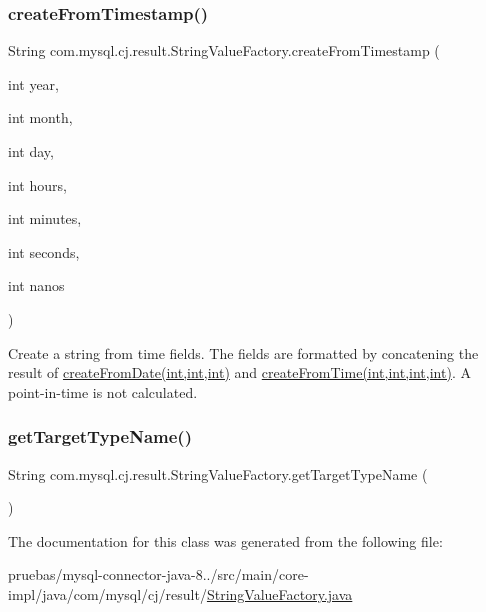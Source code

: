 \subsubsection{\texorpdfstring{create\+From\+Timestamp()}{createFromTimestamp()}}
{\footnotesize\ttfamily String com.\+mysql.\+cj.\+result.\+String\+Value\+Factory.\+create\+From\+Timestamp (\begin{DoxyParamCaption}\item[{int}]{year,  }\item[{int}]{month,  }\item[{int}]{day,  }\item[{int}]{hours,  }\item[{int}]{minutes,  }\item[{int}]{seconds,  }\item[{int}]{nanos }\end{DoxyParamCaption})}

Create a string from time fields. The fields are formatted by concatening the result of \mbox{\hyperlink{classcom_1_1mysql_1_1cj_1_1result_1_1_string_value_factory_a845e3704aa7f1a243b1fca5975dff12a}{create\+From\+Date(int,int,int)}} and \mbox{\hyperlink{classcom_1_1mysql_1_1cj_1_1result_1_1_string_value_factory_a403e61bfaa13268e2eb0a15ff92e0aea}{create\+From\+Time(int,int,int,int)}}. A point-\/in-\/time is not calculated. \mbox{\label{classcom_1_1mysql_1_1cj_1_1result_1_1_string_value_factory_ae9d043abc23f82f37cc3552f02469ea8}} 
\subsubsection{\texorpdfstring{get\+Target\+Type\+Name()}{getTargetTypeName()}}
{\footnotesize\ttfamily String com.\+mysql.\+cj.\+result.\+String\+Value\+Factory.\+get\+Target\+Type\+Name (\begin{DoxyParamCaption}{ }\end{DoxyParamCaption})}



The documentation for this class was generated from the following file\+:\begin{DoxyCompactItemize}
\item 
pruebas/mysql-\/connector-\/java-\/8../src/main/core-\/impl/java/com/mysql/cj/result/\mbox{\hyperlink{_string_value_factory_8java}{String\+Value\+Factory.\+java}}\end{DoxyCompactItemize}
